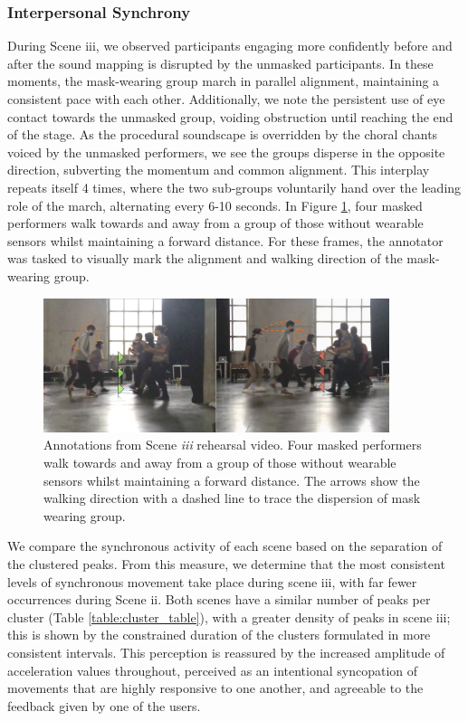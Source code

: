 \subsubsection{Interpersonal Synchrony}

During Scene iii, we observed participants engaging more confidently before and after the sound mapping is disrupted by the unmasked participants. In these moments, the mask-wearing group march in parallel alignment, maintaining a consistent pace with each other. Additionally, we note the persistent use of eye contact towards the unmasked group, voiding obstruction until reaching the end of the stage. As the procedural soundscape is overridden by the choral chants voiced by the unmasked performers, we see the groups disperse in the opposite direction, subverting the momentum and common alignment. This interplay repeats itself 4 times, where the two sub-groups voluntarily hand over the leading role of the march, alternating every 6-10 seconds. In Figure \ref{fig:scene_iii_annotation}, four masked performers walk towards and away from a group of those without wearable sensors whilst maintaining a forward distance. For these frames, the annotator was tasked to visually mark the alignment and walking direction of the mask-wearing group.

\begin{figure}[!h]
\centering
\includegraphics[width=0.9\textwidth,keepaspectratio]{Chapters/Figures/adse_ess/scene_iii-merged-2.png}
{
\caption[Annotations from Scene \textit{iii} rehearsal video]{Annotations from Scene \textit{iii} rehearsal video. Four masked performers walk towards and away from a group of those without wearable sensors whilst maintaining a forward distance. The arrows show the walking direction with a dashed line to trace the dispersion of mask wearing group.
}
\label{fig:scene_iii_annotation}
}
\end{figure}

We compare the synchronous activity of each scene based on the separation of the clustered peaks. From this measure, we determine that the most consistent levels of synchronous movement take place during scene iii, with far fewer occurrences during Scene ii. Both scenes have a similar number of peaks per cluster (Table \ref{table:cluster_table}), with a greater density of peaks in scene iii; this is shown by the constrained duration of the clusters formulated in more consistent intervals. This perception is reassured by the increased amplitude of acceleration values throughout, perceived as an intentional syncopation of movements that are highly responsive to one another, and agreeable to the feedback given by one of the users.

